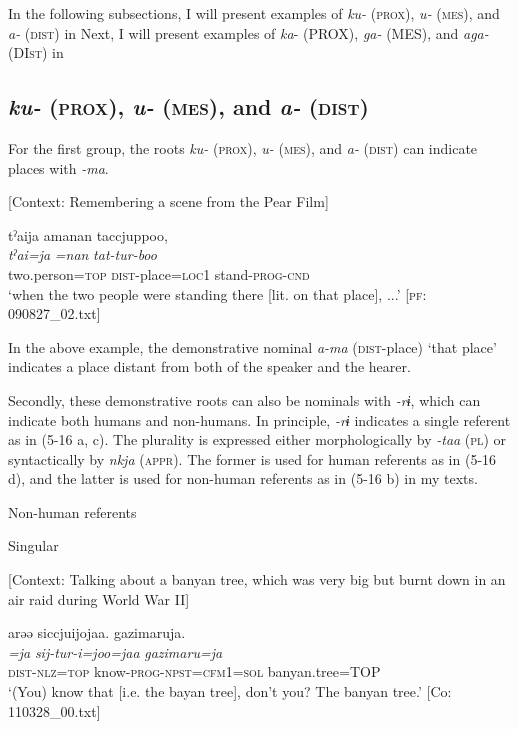 In the following subsections, I will present examples of \textit{ku-} (\textsc{prox}), \textit{u-} (\textsc{mes}), and \textit{a-} (\textsc{dist}) in  Next, I will present examples of \textit{ka}{}- (PROX), \textit{ga-} (MES), and \textit{aga-} (DI\textsc{st}) in 

\subsection{\textit{ku-} (\textsc{prox}), \textit{u-} (\textsc{mes}), and \textit{a-} (\textsc{dist})}
\label{sec:key:5.2.1}
For the first group, the roots \textit{ku-} (\textsc{prox}), \textit{u-} (\textsc{mes}), and \textit{a-} (\textsc{dist}) can indicate places with \textit{{}-ma}.

\ea \label{ex:5:15}   [Context: Remembering a scene from the Pear Film]

\glll  tˀaija  amanan  taccjuppoo,\\
\textit{tˀai=ja}  \textit{=nan}  \textit{tat-tur-boo}\\
two.person=\textsc{top}  \textsc{dist}-place=\textsc{loc}1  stand-\textsc{prog}-\textsc{cnd}\\
\glt ‘when the two people were standing there [lit. on that place], ...’ [\textsc{pf}: 090827\_02.txt]
\z

In the above example, the demonstrative nominal \textit{a-ma} (\textsc{dist}-place) ‘that place’ indicates a place distant from both of the speaker and the hearer.

Secondly, these demonstrative roots can also be nominals with \textit{{}-rɨ}, which can indicate both humans and non-humans. In principle, \textit{{}-rɨ} indicates a single referent as in (5-16 a, c). The plurality is expressed either morphologically by \textit{{}-taa} (\textsc{pl}) or syntactically by \textit{nkja} (\textsc{appr}). The former is used for human referents as in (5-16 d), and the latter is used for non-human referents as in (5-16 b) in my texts.

\ea \label{ex:5:16}   Non-human referents

 \ea \label{ex:5:16a} Singular

    [Context: Talking about a banyan tree, which was very big but burnt down in an air raid during World War II]

\glll  arəə  siccjuijojaa.  gazimaruja.\\
\textit{=ja}  \textit{sij-tur-i=joo=jaa}  \textit{gazimaru=ja}\\
\textsc{dist}-\textsc{nlz}=\textsc{top}  know-\textsc{prog}-\textsc{npst}=\textsc{cfm}1=\textsc{sol}  banyan.tree=TOP\\
\glt ‘(You) know that [i.e. the bayan tree], don’t you? The banyan tree.’ [Co: 110328\_00.txt]

